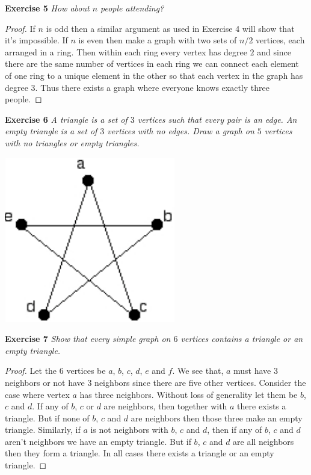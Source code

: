 \documentclass{article}
\begin{document}
\begin{flushleft}
\textbf{Exercise 5}
\textsl{How about $n$ people attending?}
\begin{proof}
If $n$ is odd then a similar argument as used in Exercise 4 will show that it's impossible. If $n$ is even then make a graph with two sets of $n/2$ vertices, each arranged in a ring. Then within each ring every vertex has degree $2$ and since there are the same number of vertices in each ring we can connect each element of one ring to a unique element in the other so that each vertex in the graph has degree $3$. Thus there exists a graph where everyone knows exactly three people.
\end{proof}

\textbf{Exercise 6}
\textsl{A triangle is a set of $3$ vertices such that every pair is an edge. An empty triangle is a set of $3$ vertices with no edges. Draw a graph on $5$ vertices with no triangles or empty triangles.}\newline

\begin{center}
\includegraphics{star}
\end{center}

\textbf{Exercise 7}
\textsl{Show that every simple graph on $6$ vertices contains a triangle or an empty triangle.}
\begin{proof}
Let the $6$ vertices be $a$, $b$, $c$, $d$, $e$ and $f$. We see that, $a$ must have $3$ neighbors or not have $3$ neighbors since there are five other vertices. Consider the case where vertex $a$ has three neighbors. Without loss of generality let them be $b$, $c$ and $d$. If any of $b$, $c$ or $d$ are neighbors, then together with $a$ there exists a triangle. But if none of $b$, $c$ and $d$ are neighbors then those three make an empty triangle. Similarly, if $a$ is not neighbors with $b$, $c$ and $d$, then if any of $b$, $c$ and $d$ aren't neighbors we have an empty triangle. But if $b$, $c$ and $d$ are all neighbors then they form a triangle. In all cases there exists a triangle or an empty triangle.
\end{proof}


\end{flushleft}
\end{document}
